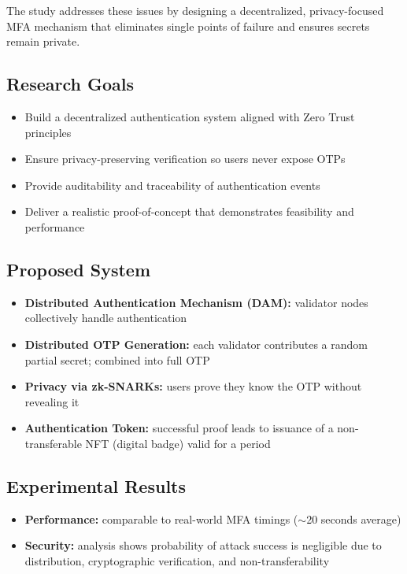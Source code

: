The study addresses these issues by designing a decentralized, privacy-focused MFA mechanism that eliminates single points of failure and ensures secrets remain private.

\subsection{Research Goals}

\begin{itemize}
    \item Build a decentralized authentication system aligned with Zero Trust principles
    \item Ensure privacy-preserving verification so users never expose OTPs
    \item Provide auditability and traceability of authentication events
    \item Deliver a realistic proof-of-concept that demonstrates feasibility and performance
\end{itemize}

\subsection{Proposed System}

\begin{itemize}
    \item \textbf{Distributed Authentication Mechanism (DAM):} validator nodes collectively handle authentication
    \item \textbf{Distributed OTP Generation:} each validator contributes a random partial secret; combined into full OTP
    \item \textbf{Privacy via zk-SNARKs:} users prove they know the OTP without revealing it
    \item \textbf{Authentication Token:} successful proof leads to issuance of a non-transferable NFT (digital badge) valid for a period
\end{itemize}

\subsection{Experimental Results}

\begin{itemize}
    \item \textbf{Performance:} comparable to real-world MFA timings ($\sim$20 seconds average)
    \item \textbf{Security:} analysis shows probability of attack success is negligible due to distribution, cryptographic verification, and non-transferability
\end{itemize}


